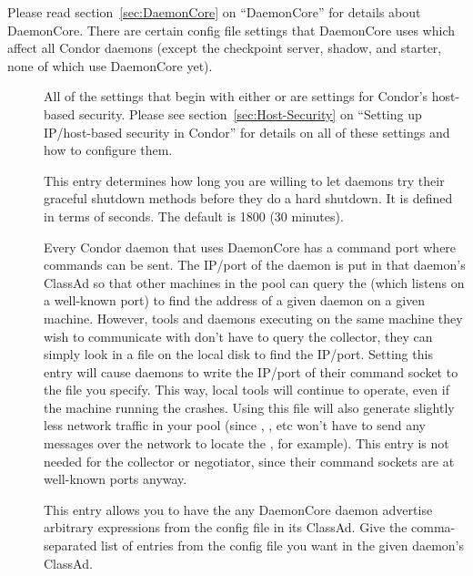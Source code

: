 Please read section~\ref{sec:DaemonCore} on ``DaemonCore'' for details
about DaemonCore.  There are certain config file settings that
DaemonCore uses which affect all Condor daemons (except the checkpoint
server, shadow, and starter, none of which use DaemonCore yet).
\begin{description}
  
\item[] \label{param:HostAllow} All of the
  settings that begin with either  or
   are settings for Condor's host-based security.
  Please see section~\ref{sec:Host-Security} on ``Setting up
  IP/host-based security in Condor'' for details on all of these
  settings and how to configure them.

\item[]
  \label{param:ShutdownGracefulTimeout} This entry determines how long
  you are willing to let daemons try their graceful shutdown methods
  before they do a hard shutdown.  It is defined in terms of seconds.
  The default is 1800 (30 minutes).

\item[]
  \label{param:SubsysAddressFile} Every Condor daemon that uses
  DaemonCore has a command port where commands can be sent.  The
  IP/port of the daemon is put in that daemon's ClassAd so that other
  machines in the pool can query the  (which listens
  on a well-known port) to find the address of a given daemon on a
  given machine.  However, tools and daemons executing on the same
  machine they wish to communicate with don't have to query the
  collector, they can simply look in a file on the local disk to find
  the IP/port.  Setting this entry will cause daemons to write the
  IP/port of their command socket to the file you specify.  This way,
  local tools will continue to operate, even if the machine running
  the  crashes.  Using this file will also generate
  slightly less network traffic in your pool (since ,
  , etc won't have to send any messages over the network to
  locate the , for example).  This entry is not needed
  for the collector or negotiator, since their command sockets are at
  well-known ports anyway.  
  
\item[] \label{param:SubsysExprs} This entry
  allows you to have the any DaemonCore daemon advertise arbitrary
  expressions from the config file in its ClassAd.  Give the
  comma-separated list of entries from the config file you want in the
  given daemon's ClassAd.
  

\end{description}
